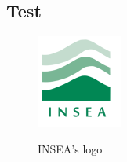 \documentclass[../Main.tex]{subfiles}
\begin{document}
\renewcommand{\thesubsection}{A\arabic{subsection}}
\renewcommand{\thetable}{A\arabic{subsection}.\arabic{table}}

\subsection{Test}
\begin{figure}[h]
    \centering
    \caption{INSEA's logo}
    \includegraphics[width=0.2\columnwidth]{img/logo.png}
    \label{fig:logo2}
\end{figure}

\biblio %
\end{document}
